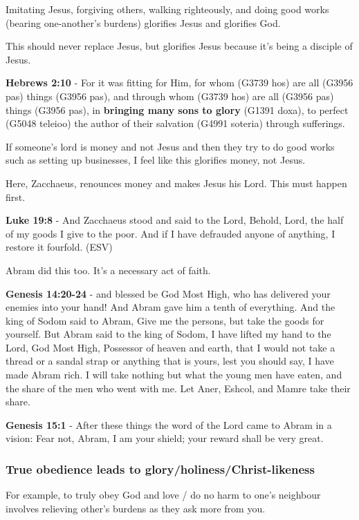 \documentclass[11pt]{article}
\begin{document}
Imitating Jesus, forgiving others, walking righteously, and doing good works (bearing one-another's burdens) glorifies Jesus and glorifies God.

This should never replace Jesus, but glorifies Jesus because it's being a disciple of Jesus.

\textbf{Hebrews 2:10} - For it was fitting for Him, for whom (G3739 hos) are all (G3956 pas) things (G3956 pas), and through whom (G3739 hos) are all (G3956 pas) things (G3956 pas), in \textbf{bringing many sons to glory} (G1391 doxa), to perfect (G5048 teleioo) the author of their salvation (G4991 soteria) through sufferings.

If someone's lord is money and not Jesus and then they try to do good works such as setting up businesses, I feel like this glorifies money, not Jesus.

Here, Zacchaeus, renounces money and makes Jesus his Lord. This must happen first.

\textbf{Luke 19:8} - And Zacchaeus stood and said to the Lord, Behold, Lord, the half of my goods I give to the poor. And if I have defrauded anyone of anything, I restore it fourfold. (ESV)

Abram did this too. It's a necessary act of faith.

\textbf{Genesis 14:20-24} - and blessed be God Most High, who has delivered your enemies into your hand! And Abram gave him a tenth of everything. And the king of Sodom said to Abram, Give me the persons, but take the goods for yourself. But Abram said to the king of Sodom, I have lifted my hand to the Lord, God Most High, Possessor of heaven and earth, that I would not take a thread or a sandal strap or anything that is yours, lest you should say, I have made Abram rich. I will take nothing but what the young men have eaten, and the share of the men who went with me. Let Aner, Eshcol, and Mamre take their share.

\textbf{Genesis 15:1} - After these things the word of the Lord came to Abram in a vision: Fear not, Abram, I am your shield; your reward shall be very great.

\subsubsection{True obedience leads to glory/holiness/Christ-likeness}
\label{sec:org9965944}
For example, to truly obey God and love / do no harm to one's neighbour involves relieving other's burdens as they ask more from you.
\end{document}
